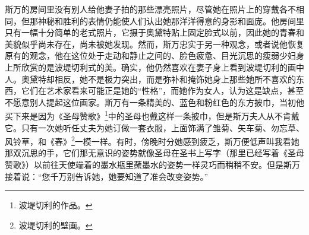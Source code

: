 \par 斯万的房间里没有别人给他妻子拍的那些漂亮照片，尽管她在照片上的穿戴各不相同，但那神秘和胜利的表情仍能使人们认出她那洋洋得意的身影和面庞。他房间里只有一幅十分简单的老式照片，它摄于奥黛特贴上固定脸式以前，因此她的青春和美貌似乎尚未存在，尚未被她发现。然而，斯万忠实于另一种观念，或者说他恢复原有的观念，他在这位处于走动和静止之间的、脸色疲惫、目光沉思的瘦弱少妇身上所欣赏的是波堤切利式的美。确实，他仍然喜欢在妻子身上看到波堤切利的画中人。奥黛特却相反，她不是极力突出，而是弥补和掩饰她身上那些她所不喜欢的东西，它们在艺术家看来可能正是她的“性格”，而她作为女人，认为这是缺点，甚至不愿意别人提起这位画家。斯万有一条精美的、蓝色和粉红色的东方披巾，当初他买下来是因为《圣母赞歌》\footnote{波堤切利的作品。}中的圣母也戴这样一条披巾，但是斯万夫人从不肯戴它。只有一次她听任丈夫为她订做一套衣服，上面饰满了雏菊、矢车菊、勿忘草、风铃草，和《春》\footnote{波堤切利的壁画。}一模一样。有时，傍晚时分她感到疲乏，斯万便低声叫我看她那双沉思的手，它们那无意识的姿势就像圣母在圣书上写字（那里已经写着《圣母赞歌》）以前往天使端着的墨水瓶里蘸墨水的姿势一样灵巧而稍稍不安。但是斯万接着说：“您千万别告诉她，她要知道了准会改变姿势。”
